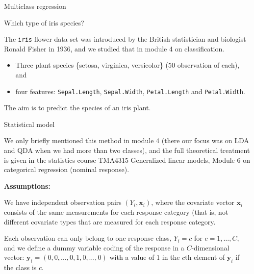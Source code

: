 \documentclass[10pt,ignorenonframetext,]{beamer}
\providecommand{\tightlist}{%
  \setlength{\itemsep}{0pt}\setlength{\parskip}{0pt}}
\begin{document}
\begin{frame}[fragile]

\begin{block}{Multiclass regression}

\begin{block}{Which type of iris species?}

The \texttt{iris} flower data set was introduced by the British
statistician and biologist Ronald Fisher in 1936, and we studied that in
module 4 on classification.

\begin{itemize}
\tightlist
\item
  Three plant species \{setosa, virginica, versicolor\} (50 observation
  of each), and
\item
  four features: \texttt{Sepal.Length}, \texttt{Sepal.Width},
  \texttt{Petal.Length} and \texttt{Petal.Width}.
\end{itemize}

The aim is to predict the species of an iris plant.

\end{block}

\end{block}

\end{frame}

\begin{frame}

\begin{block}{Statistical model}

We only briefly mentioned this method in module 4 (there our focus was
on LDA and QDA when we had more than two classes), and the full
theoretical treatment is given in the statistics course TMA4315
Generalized linear models, Module 6 on categorical regression (nominal
response).

\textbf{Assumptions:}

We have independent observation pairs \((Y_i,{\boldsymbol x}_i)\), where
the covariate vector \({\boldsymbol x}_i\) consists of the same
measurements for each response category (that is, not different
covariate types that are measured for each response category.

Each observation can only belong to one response class, \(Y_i=c\) for
\(c=1,\ldots, C\), and we define a dummy variable coding of the response
in a \(C\)-dimensional vector:
\({\boldsymbol y}_i=(0,0,\ldots,0,1,0,\ldots,0)\) with a value of \(1\)
in the \(c\)th element of \({\boldsymbol y}_i\) if the class is \(c\).

\end{block}

\end{frame}
\end{document}
